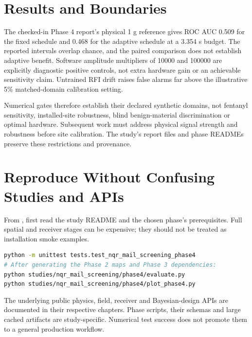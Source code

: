 \section{Results and Boundaries}

The checked-in Phase 4 report's physical 1 g reference gives ROC AUC 0.509
for the fixed schedule and 0.468 for the adaptive schedule at a 3.354 s budget.
The reported intervals overlap chance, and the paired comparison does not
establish adaptive benefit. Software amplitude multipliers of 10000 and 100000
are explicitly diagnostic positive controls, not extra hardware gain or an
achievable sensitivity claim. Untrained RFI drift raises false alarms far above
the illustrative 5\% matched-domain calibration setting.

Numerical gates therefore establish their declared synthetic domains, not
fentanyl sensitivity, installed-site robustness, blind benign-material
discrimination or optimal hardware. Subsequent work must address physical
signal strength and robustness before site calibration. The study's report
files and phase READMEs preserve these restrictions and provenance.

\section{Reproduce Without Confusing Studies and APIs}

From , first read the study README and the chosen
phase's prerequisites. Full spatial and receiver stages can be expensive;
they should not be treated as installation smoke examples.
\begin{lstlisting}[language=bash]
python -m unittest tests.test_nqr_mail_screening_phase4
# After generating the Phase 2 maps and Phase 3 dependencies:
python studies/nqr_mail_screening/phase4/evaluate.py
python studies/nqr_mail_screening/phase4/plot_phase4.py
\end{lstlisting}

The underlying public physics, field, receiver and Bayesian-design APIs are
documented in their respective chapters. Phase scripts, their schemas and
large cached artifacts are study-specific. Numerical test success does not
promote them to a general production workflow.
